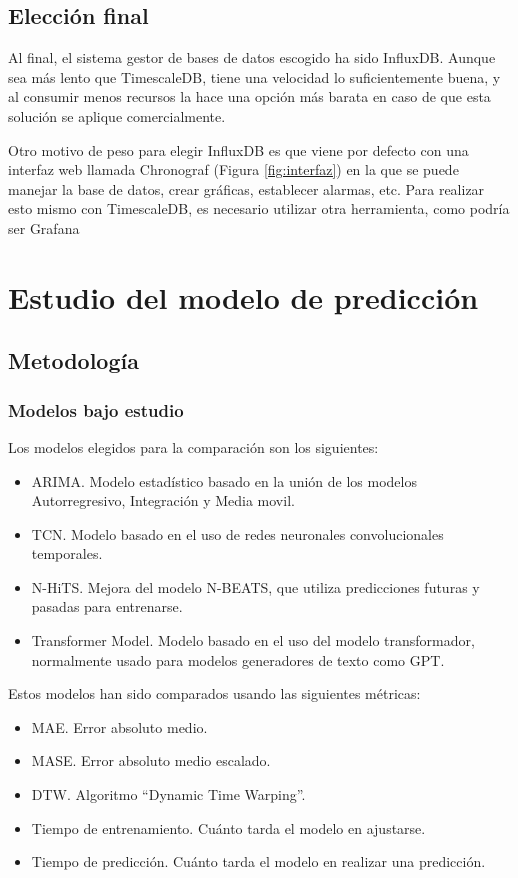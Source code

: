 \subsection{Elección final}

Al final, el sistema gestor de bases de datos escogido ha sido InfluxDB. Aunque sea más lento que TimescaleDB, tiene
una velocidad lo suficientemente buena, y al consumir menos recursos la hace una opción más barata en caso de que 
esta solución se aplique comercialmente.

Otro motivo de peso para elegir InfluxDB es que viene por defecto con una interfaz web llamada Chronograf 
(Figura \ref{fig:interfaz}) en la que se puede manejar la base de datos, crear gráficas, establecer alarmas, etc. 
Para realizar esto mismo con TimescaleDB, es necesario utilizar otra herramienta, como podría ser Grafana \cite{Web:Grafana:Docs}


\section{Estudio del modelo de predicción}

\subsection{Metodología}

\subsubsection{Modelos bajo estudio}

Los modelos elegidos para la comparación son los siguientes:
\begin{itemize}
    \item ARIMA. Modelo estadístico basado en la unión de los modelos Autorregresivo, Integración y Media movil.
    \item TCN. Modelo basado en el uso de redes neuronales convolucionales temporales.
    \item N-HiTS. Mejora del modelo N-BEATS, que utiliza predicciones futuras y pasadas para entrenarse.
    \item Transformer Model. Modelo basado en el uso del modelo transformador, normalmente usado para modelos generadores de texto como GPT.
\end{itemize}

Estos modelos han sido comparados usando las siguientes métricas:
\begin{itemize}
    \item MAE. Error absoluto medio.
    \item MASE. Error absoluto medio escalado.
    \item DTW. Algoritmo ``Dynamic Time Warping''.
    \item Tiempo de entrenamiento. Cuánto tarda el modelo en ajustarse.
    \item Tiempo de predicción. Cuánto tarda el modelo en realizar una predicción.
\end{itemize}

